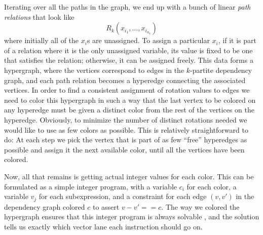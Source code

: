 Iterating over all the paths in the graph, we end up with a bunch of linear {\em path relations} that look like $$R_k(x_{i_1}, \dots, x_{i_{n_k}})$$ where initially all of the $x_i$s are unassigned.
To assign a particular $x_i$, if it is part of a relation where it is the only unassigned variable, its value is fixed to be one that satisfies the relation; otherwise, it can be assigned freely.
This data forms a hypergraph, where the vertices correspond to edges in the $k$-partite dependency graph, and each path relation becomes a hyperedge connecting the associated vertices.
In order to find a consistent assignment of rotation values to edges we need to color this hypergraph in such a way that the last vertex to be colored on any hyperedge must be given a distinct color from the rest of the vertices on the hyperedge.
Obviously, to minimize the number of distinct rotations needed we would like to use as few colors as possible.
This is relatively straightforward to do: At each step we pick the vertex that is part of as few ``free'' hyperedges as possible and assign it the next available color, until all the vertices have been colored.

Now, all that remains is getting actual integer values for each color. 
This can be formulated as a simple integer program, with a variable $c_i$ for each color, a variable  $v_j$ for each subexpression, and a constraint for each edge $(v, v')$ in the dependency graph colored $c$ to assert $v - v' == c$.
The way we colored the hypergraph ensures that this integer program is always solvable , and the solution tells us exactly which vector lane each instruction should go on.

